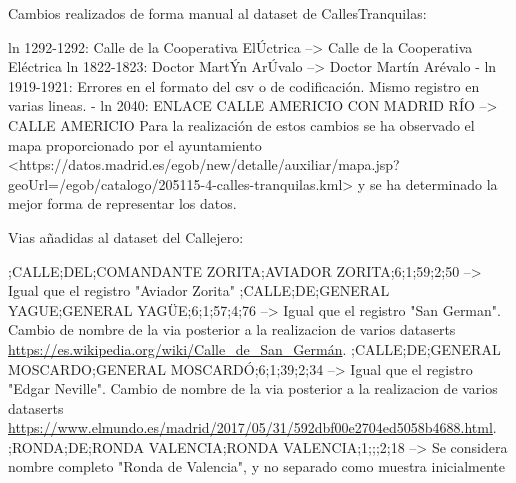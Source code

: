 
	\item Cambios realizados de forma manual al dataset de CallesTranquilas:
\begin{tiny}
\newline ln 1292-1292: Calle de la Cooperativa ElÚctrica --> Calle de la Cooperativa Eléctrica
\newline ln 1822-1823: Doctor MartÝn ArÚvalo --> Doctor Martín Arévalo
\newline - ln 1919-1921: Errores en el formato del csv o de codificación. Mismo registro en varias lineas.
\newline - ln 2040: ENLACE CALLE AMERICIO CON MADRID RÍO --> CALLE AMERICIO
\newline 
Para la realización de estos cambios se ha observado el mapa proporcionado por el ayuntamiento <https://datos.madrid.es/egob/new/detalle/auxiliar/mapa.jsp?geoUrl=/egob/catalogo/205115-4-calles-tranquilas.kml> y se ha determinado la mejor forma de representar los datos.
\newline 
\end{tiny}









	\item Vias añadidas al dataset del Callejero:
\begin{tiny}
;CALLE;DEL;COMANDANTE ZORITA;AVIADOR ZORITA;6;1;59;2;50 --> Igual que el registro "Aviador Zorita"
;CALLE;DE;GENERAL YAGUE;GENERAL YAGÜE;6;1;57;4;76 --> Igual que el registro "San German". Cambio de nombre de la via posterior a la realizacion de varios dataserts \url{https://es.wikipedia.org/wiki/Calle_de_San_Germán}.
;CALLE;DE;GENERAL MOSCARDO;GENERAL MOSCARDÓ;6;1;39;2;34 --> Igual que el registro "Edgar Neville". Cambio de nombre de la via posterior a la realizacion de varios dataserts \url{https://www.elmundo.es/madrid/2017/05/31/592dbf00e2704ed5058b4688.html}.
;RONDA;DE;RONDA VALENCIA;RONDA VALENCIA;1;;;2;18 --> Se considera nombre completo "Ronda de Valencia", y no separado como muestra inicialmente
\newline
\end{tiny}

